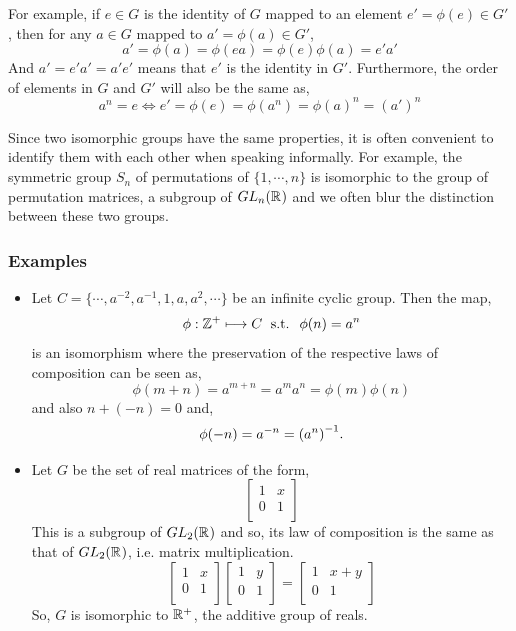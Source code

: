 \documentclass[MathsNotesBase.tex]{subfiles}
\begin{document}
{		 For example, if $e \in G$ is the identity of $G$ mapped to an element $ e' = \phi(e) \in G' $, then for any $a \in G$ mapped to $a' = \phi(a) \in G'$,
		\[ a' = \phi(a) = \phi(ea) = \phi(e)\phi(a) = e'a' \]
		And $a' = e'a' = a'e'$ means that $e'$ is the identity in $G'$. Furthermore, the order of elements in $G$ and $G'$ will also be the same as,
		\[ a^n = e \iff e' = \phi(e) = \phi(a^n) = \phi(a)^n = (a')^n \]
		
		Since two isomorphic groups have the same properties, it is often convenient to identify them with each other when speaking informally. For example, the symmetric group $S_n$ of permutations of $\{1,\cdots,n\}$ is isomorphic to the group of permutation matrices, a subgroup of $GL_n(\mathbb{R}^{})$ and we often blur the distinction between these two groups.\\
		
	
		\subsubsection{Examples}
		\begin{itemize}
			\item{
				Let $C = \{ \cdots, a^{-2}, a^{-1}, 1, a, a^2, \cdots \}$ be an infinite cyclic group. Then the map,
				\[ \phi : \mathbb{Z}^{+} \longmapsto C \; \text{ s.t. } \; \phi(n) = a^n \]
				is an isomorphism where the preservation of the respective laws of composition can be seen as,
				\[ \phi(m + n) = a^{m + n} = a^ma^n = \phi(m)\phi(n) \]
				and also ${ n + (-n) = 0 }$ and,
				\[ \phi(-n) = a^{-n} = {(a^n)}^{-1}. \]
			}
			\item{Let $G$ be the set of real matrices of the form,
				\[
				\begin{bmatrix}
				1 & x 	\\
				0 & 1 	\\
				\end{bmatrix} 
				\]
				This is a subgroup of $GL_2(\mathbb{R}^{})$ and so, its law of composition is the same as that of $GL_2(\mathbb{R}^{})$, i.e. matrix multiplication.
				\[
				\begin{bmatrix}
				1 & x 	\\
				0 & 1 	\\
				\end{bmatrix}
				\begin{bmatrix}
				1 & y 	\\
				0 & 1 	\\
				\end{bmatrix} = 
				\begin{bmatrix}
				1 & x + y\\
				0 & 1 	\\
				\end{bmatrix}
				\]
				So, $G$ is isomorphic to $\mathbb{R}^{+}$, the additive group of reals.
			}
		\end{itemize}
		
}
\end{document}
